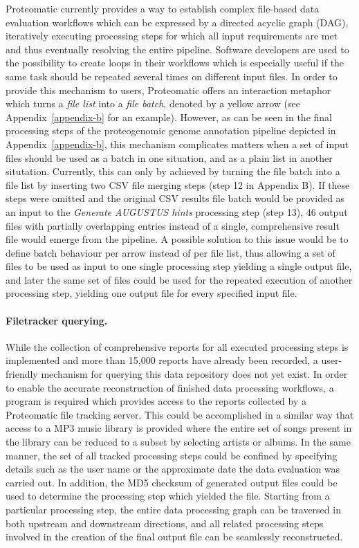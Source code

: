 Proteomatic currently provides a way to establish complex file-based data 
evaluation workflows which can be expressed by a directed acyclic graph (DAG),
iteratively executing processing steps for which all input requirements are
met and thus eventually resolving the entire pipeline.
Software developers are used to the possibility to create loops in their
workflows which is especially useful if the same task should be repeated
several times on different input files.
In order to provide this mechanism to users, Proteomatic offers an interaction 
metaphor which turns a {\em file list} into a {\em file batch}, denoted by a 
yellow arrow (see Appendix~\ref{appendix-b} for an example).
However, as can be seen in the final processing steps of the proteogenomic
genome annotation pipeline depicted in Appendix~\ref{appendix-b}, 
this mechanism complicates matters when
a set of input files should be used as a batch in one situation, and as a
plain list in another situtation.
Currently, this can only by achieved by turning the file batch into a file
list by inserting two CSV file merging steps (step 12 in Appendix B).
If these steps were omitted and the original CSV results file batch
would be provided as an input to the {\em Generate AUGUSTUS hints} processing
step (step 13), 46 output files with partially overlapping entries instead of
a single, comprehensive result file would emerge from the pipeline.
A possible solution to this issue would be to define batch behaviour per
arrow instead of per file list, thus allowing a set of files to be used as 
input to one single processing step yielding a single output file, and
later the same set of files could be used for the repeated execution of 
another processing step, yielding one output file for every specified input 
file.

\paragraph{Filetracker querying.}

While the collection of comprehensive reports for all executed processing steps
is implemented and more than 15,000 reports have already been recorded, a
user-friendly mechanism for querying this data repository does not yet exist.
In order to enable the accurate reconstruction of finished data processing 
workflows, a program is required which provides access to the reports collected
by a Proteomatic file tracking server.
This could be accomplished in a similar way that access to a MP3 music library 
is provided where the entire set of songs present in the library can be 
reduced to a subset by selecting artists or albums. 
In the same manner, the set of all tracked processing steps could be confined
by specifying details such as the user name or the approximate date the data
evaluation was carried out.
In addition, the MD5 checksum of generated output files could be used to 
determine the processing step which yielded the file.
Starting from a particular processing step, the entire data processing graph
can be traversed in both upstream and downstream directions, and all related
processing steps involved in the creation of the final output file can
be seamlessly reconstructed.

